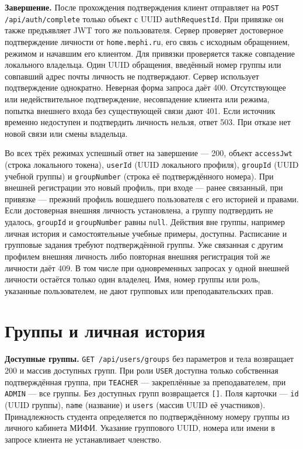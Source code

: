 \documentclass[12pt,a4paper]{article}
\begin{document}
\textbf{Завершение.} После прохождения подтверждения клиент отправляет на \texttt{POST /\allowbreak{}api/\allowbreak{}auth/\allowbreak{}complete} только объект с UUID \texttt{auth\allowbreak{}Request\allowbreak{}Id}. При привязке он также предъявляет JWT того же пользователя. Сервер проверяет достоверное подтверждение личности от \texttt{home.\allowbreak{}mephi.\allowbreak{}ru}, его связь с исходным обращением, режимом и начавшим его клиентом. Для привязки проверяется также совпадение локального владельца. Один UUID обращения, введённый номер группы или совпавший адрес почты личность не подтверждают. Сервер использует подтверждение однократно. Неверная форма запроса даёт 400. Отсутствующее или недействительное подтверждение, несовпадение клиента или режима, попытка внешнего входа без существующей связи дают 401. Если источник временно недоступен и подтвердить личность нельзя, ответ 503. При отказе нет новой связи или смены владельца.

Во всех трёх режимах успешный ответ на завершение --- 200, объект \texttt{accessJwt} (строка локального токена), \texttt{userId} (UUID локального профиля), \texttt{groupId} (UUID учебной группы) и \texttt{group\allowbreak{}Number} (строка её подтверждённого номера). При внешней регистрации это новый профиль, при входе --- ранее связанный, при привязке --- прежний профиль вошедшего пользователя с его историей и правами. Если достоверная внешняя личность установлена, а группу подтвердить не удалось, \texttt{groupId} и \texttt{group\allowbreak{}Number} равны \texttt{null}. Действия вне группы, например личная история и самостоятельные учебные примеры, доступны. Расписание и групповые задания требуют подтверждённой группы. Уже связанная с другим профилем внешняя личность либо повторная внешняя регистрация той же личности даёт 409. В том числе при одновременных запросах у одной внешней личности остаётся только один владелец. Имя, номер группы или роль, указанные пользователем, не дают групповых или преподавательских прав.

\section{Группы и личная история}\label{ux433ux440ux443ux43fux43fux44b-ux438-ux43bux438ux447ux43dux430ux44f-ux438ux441ux442ux43eux440ux438ux44f}

\hypertarget{группы-и-личная-история}{}

\textbf{Доступные группы.} \texttt{GET /\allowbreak{}api/\allowbreak{}users/\allowbreak{}groups} без параметров и тела возвращает 200 и массив доступных групп. При роли \texttt{USER} доступна только собственная подтверждённая группа, при \texttt{TEACHER} --- закреплённые за преподавателем, при \texttt{ADMIN} --- все группы. Без доступных групп возвращается \texttt{{[}{]}}. Поля карточки --- \texttt{id} (UUID группы), \texttt{name} (название) и \texttt{users} (массив UUID её участников). Принадлежность студента определяется по подтверждённому номеру группы из личного кабинета МИФИ. Указание группового UUID, номера или имени в запросе клиента не устанавливает членство.
\end{document}
